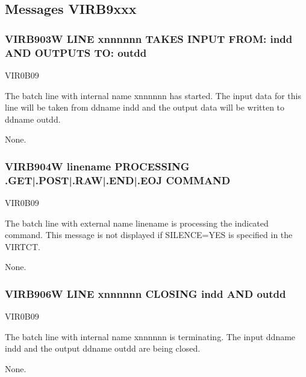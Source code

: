 \documentclass[letterpaper,10pt,english]{sphinxmanual}
\begin{document}
\subsection{Messages VIRB9xxx}
\label{\detokenize{messages:messages-virb9xxx}}

\subsubsection{VIRB903W LINE x\sphinxhyphen{}nnnnnn TAKES INPUT FROM: indd AND OUTPUTS TO: outdd}
\label{\detokenize{messages:virb903w-line-x-nnnnnn-takes-input-from-indd-and-outputs-to-outdd}}\begin{description}
\sphinxAtStartPar
VIR0B09

\sphinxAtStartPar
The batch line with internal name x\sphinxhyphen{}nnnnnn has started. The input data for this line will be taken from ddname indd and the output data will be written to ddname outdd.

\sphinxAtStartPar
None.

\end{description}


\subsubsection{VIRB904W linename PROCESSING .GET|.POST|.RAW|.END|.EOJ COMMAND}
\label{\detokenize{messages:virb904w-linename-processing-get-post-raw-end-eoj-command}}\begin{description}
\sphinxAtStartPar
VIR0B09

\sphinxAtStartPar
The batch line with external name linename is processing the indicated command. This message is not displayed if SILENCE=YES is specified in the VIRTCT.

\sphinxAtStartPar
None.

\end{description}


\subsubsection{VIRB906W LINE x\sphinxhyphen{}nnnnnn CLOSING indd AND outdd}
\label{\detokenize{messages:virb906w-line-x-nnnnnn-closing-indd-and-outdd}}\begin{description}
\sphinxAtStartPar
VIR0B09

\sphinxAtStartPar
The batch line with internal name x\sphinxhyphen{}nnnnnn is terminating. The input ddname indd and the output ddname outdd are being closed.

\sphinxAtStartPar
None.

\end{description}
\end{document}
